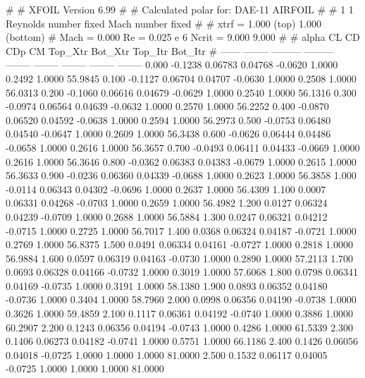 #  
#       XFOIL         Version 6.99
#  
# Calculated polar for: DAE-11 AIRFOIL                                  
#  
# 1 1 Reynolds number fixed          Mach number fixed         
#  
# xtrf =   1.000 (top)        1.000 (bottom)  
# Mach =   0.000     Re =     0.025 e 6     Ncrit =   9.000  9.000
#  
#   alpha    CL        CD       CDp       CM     Top_Xtr  Bot_Xtr  Top_Itr  Bot_Itr
#  ------ -------- --------- --------- -------- -------- -------- -------- --------
   0.000  -0.1238   0.06783   0.04768  -0.0620   1.0000   0.2492   1.0000  55.9845
   0.100  -0.1127   0.06704   0.04707  -0.0630   1.0000   0.2508   1.0000  56.0313
   0.200  -0.1060   0.06616   0.04679  -0.0629   1.0000   0.2540   1.0000  56.1316
   0.300  -0.0974   0.06564   0.04639  -0.0632   1.0000   0.2570   1.0000  56.2252
   0.400  -0.0870   0.06520   0.04592  -0.0638   1.0000   0.2594   1.0000  56.2973
   0.500  -0.0753   0.06480   0.04540  -0.0647   1.0000   0.2609   1.0000  56.3438
   0.600  -0.0626   0.06444   0.04486  -0.0658   1.0000   0.2616   1.0000  56.3657
   0.700  -0.0493   0.06411   0.04433  -0.0669   1.0000   0.2616   1.0000  56.3646
   0.800  -0.0362   0.06383   0.04383  -0.0679   1.0000   0.2615   1.0000  56.3633
   0.900  -0.0236   0.06360   0.04339  -0.0688   1.0000   0.2623   1.0000  56.3858
   1.000  -0.0114   0.06343   0.04302  -0.0696   1.0000   0.2637   1.0000  56.4309
   1.100   0.0007   0.06331   0.04268  -0.0703   1.0000   0.2659   1.0000  56.4982
   1.200   0.0127   0.06324   0.04239  -0.0709   1.0000   0.2688   1.0000  56.5884
   1.300   0.0247   0.06321   0.04212  -0.0715   1.0000   0.2725   1.0000  56.7017
   1.400   0.0368   0.06324   0.04187  -0.0721   1.0000   0.2769   1.0000  56.8375
   1.500   0.0491   0.06334   0.04161  -0.0727   1.0000   0.2818   1.0000  56.9884
   1.600   0.0597   0.06319   0.04163  -0.0730   1.0000   0.2890   1.0000  57.2113
   1.700   0.0693   0.06328   0.04166  -0.0732   1.0000   0.3019   1.0000  57.6068
   1.800   0.0798   0.06341   0.04169  -0.0735   1.0000   0.3191   1.0000  58.1380
   1.900   0.0893   0.06352   0.04180  -0.0736   1.0000   0.3404   1.0000  58.7960
   2.000   0.0998   0.06356   0.04190  -0.0738   1.0000   0.3626   1.0000  59.4859
   2.100   0.1117   0.06361   0.04192  -0.0740   1.0000   0.3886   1.0000  60.2907
   2.200   0.1243   0.06356   0.04194  -0.0743   1.0000   0.4286   1.0000  61.5339
   2.300   0.1406   0.06273   0.04182  -0.0741   1.0000   0.5751   1.0000  66.1186
   2.400   0.1426   0.06056   0.04018  -0.0725   1.0000   1.0000   1.0000  81.0000
   2.500   0.1532   0.06117   0.04005  -0.0725   1.0000   1.0000   1.0000  81.0000
